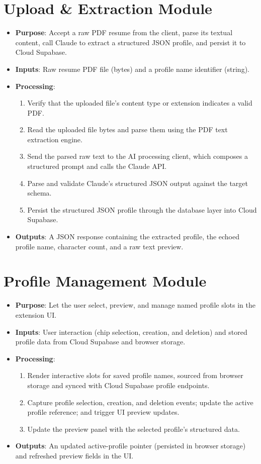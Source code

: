 \documentclass[12pt,a4paper]{report}
\begin{document}
\section{Upload \& Extraction Module}
\begin{itemize}
    \item \textbf{Purpose}: Accept a raw PDF resume from the client, parse its textual content, call Claude to extract a structured JSON profile, and persist it to Cloud Supabase.
    \item \textbf{Inputs}: Raw resume PDF file (bytes) and a profile name identifier (string).
    \item \textbf{Processing}: 
    \begin{enumerate}
        \item Verify that the uploaded file's content type or extension indicates a valid PDF.
        \item Read the uploaded file bytes and parse them using the PDF text extraction engine.
        \item Send the parsed raw text to the AI processing client, which composes a structured prompt and calls the Claude API.
        \item Parse and validate Claude's structured JSON output against the target schema.
        \item Persist the structured JSON profile through the database layer into Cloud Supabase.
    \end{enumerate}
    \item \textbf{Outputs}: A JSON response containing the extracted profile, the echoed profile name, character count, and a raw text preview.
\end{itemize}

\section{Profile Management Module}
\begin{itemize}
    \item \textbf{Purpose}: Let the user select, preview, and manage named profile slots in the extension UI.
    \item \textbf{Inputs}: User interaction (chip selection, creation, and deletion) and stored profile data from Cloud Supabase and browser storage.
    \item \textbf{Processing}: 
    \begin{enumerate}
        \item Render interactive slots for saved profile names, sourced from browser storage and synced with Cloud Supabase profile endpoints.
        \item Capture profile selection, creation, and deletion events; update the active profile reference; and trigger UI preview updates.
        \item Update the preview panel with the selected profile's structured data.
    \end{enumerate}
    \item \textbf{Outputs}: An updated active-profile pointer (persisted in browser storage) and refreshed preview fields in the UI.
\end{itemize}
\end{document}
